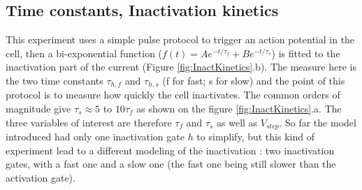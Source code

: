 \documentclass[11pt]{report}
\begin{document}
\subsection{Time constants, Inactivation kinetics}

This experiment uses a simple pulse protocol to trigger an action potential in the cell, then a bi-exponential function ($f(t) = Ae^{-t / \tau_{f}} + Be^{-t / \tau_{s}}$) is fitted to the inactivation part of the current (Figure \ref{fig:InactKinetics}.b). The measure here is the two time constants $\tau_{h,f}$ and $\tau_{h,s}$ (f for fast; s for slow) and the point of this protocol is to measure how quickly the cell inactivates. The common orders of magnitude give $\tau_{s} \approx 5 $ to $10 \tau_{f}$ as shown on the figure \ref{fig:InactKinetics}.a. The three variables of interest are therefore $\tau_{f}$ and $\tau_{s}$ as well as $V_{step}$. So far the model introduced had only one inactivation gate $h$ to simplify, but this kind of experiment lead to a different modeling of the inactivation : two inactivation gates, with a fast one and a slow one (the fast one being still slower than the activation gate).
\end{document}
